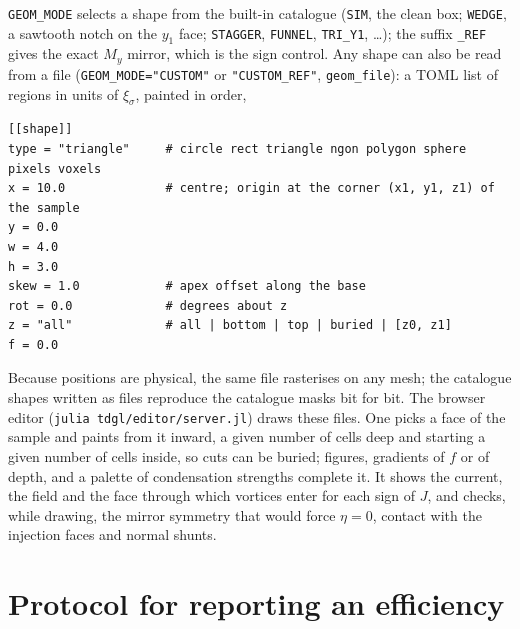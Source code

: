 \documentclass[11pt,a4paper]{article}
\newcommand{\code}[1]{\texttt{#1}}
\begin{document}
\code{GEOM\_MODE} selects a shape from the built-in catalogue (\code{SIM},
the clean box; \code{WEDGE}, a sawtooth notch on the $y_1$ face;
\code{STAGGER}, \code{FUNNEL}, \code{TRI\_Y1}, \ldots); the suffix
\code{\_REF} gives the exact $M_y$ mirror, which is the sign control. Any
shape can also be read from a file (\code{GEOM\_MODE="CUSTOM"} or
\code{"CUSTOM\_REF"}, \code{geom\_file}): a TOML list of regions in units of
$\xi_\sigma$, painted in order,
\begin{verbatim}
[[shape]]
type = "triangle"     # circle rect triangle ngon polygon sphere pixels voxels
x = 10.0              # centre; origin at the corner (x1, y1, z1) of the sample
y = 0.0
w = 4.0
h = 3.0
skew = 1.0            # apex offset along the base
rot = 0.0             # degrees about z
z = "all"             # all | bottom | top | buried | [z0, z1]
f = 0.0
\end{verbatim}
Because positions are physical, the same file rasterises on any mesh; the
catalogue shapes written as files reproduce the catalogue masks bit for
bit. The browser editor (\code{julia tdgl/editor/server.jl}) draws these
files. One picks a face of the sample and paints from it inward, a given
number of cells deep and starting a given number of cells inside, so cuts
can be buried; figures, gradients of $f$ or of depth, and a palette of
condensation strengths complete it. It shows the current, the field and the
face through which vortices enter for each sign of $J$, and checks, while
drawing, the mirror symmetry that would force $\eta=0$, contact with the
injection faces and normal shunts.

\section{Protocol for reporting an efficiency}
\end{document}
